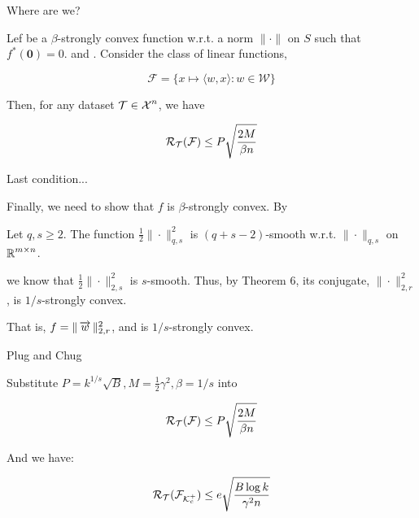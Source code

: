 \begin{frame}{Where are we?}

  \begin{theorem}[9 Generalization]
    Lef  be a $\beta$-strongly convex function w.r.t. a norm $\|\cdot \|$ on $S$ such that
    $f^*(\mathbf{0}) = 0$.  and .
    Consider the class of linear functions,

    \[ \mathcal{F} = \{ x \mapsto \langle w,x \rangle : w \in \mathcal{W} \}\]

    Then, for any dataset $\mathcal{T} \in \operatorname{\mathcal{X}}^n$, we have

    \[ \operatorname{\mathcal{R}}_{\mathcal{T}}(\mathcal{F}) \leq P \sqrt{ \frac{2M}{\beta n}  } \]
  \end{theorem}
      
\end{frame}


\begin{frame}{Last condition...}

  Finally, we need to show that $f$ is $\beta$-strongly convex. By
  
  \begin{corollary}[19]
  Let $q,s \geq 2$. The function $\frac{1}{2}\|\cdot \|^2_{q,s}$ is $(q+s-2)$-smooth w.r.t. $\|\cdot \|_{q,s}$ on $\operatorname{\mathbb{R}}^{m \times n}$.
  \end{corollary}
  
  we know that $\frac{1}{2} \| \cdot \|^2_{2,s}$ is $s$-smooth. Thus, by Theorem 6, its conjugate, $\| \cdot \|_{2,r}^2$, is $1/s$-strongly convex. 

  \vspace*{0.5cm}
  
  That is, $f = \| \operatorname{\overrightarrow{w}}\|^2_{2,r}$, and is $1/s$-strongly convex.

  
\end{frame}


\begin{frame}{Plug and Chug}

  Substitute $P = k^{1/s}\sqrt{B}, M = \frac{1}{2}\gamma^2, \beta = 1/s$ into 

    \[ \operatorname{\mathcal{R}}_{\mathcal{T}}(\mathcal{F}) \leq P \sqrt{ \frac{2M}{\beta n}  } \]

    And we have:

    \[ \operatorname{\mathcal{R}}_{\mathcal{T}}(\mathcal{F}_{\mathcal{K}^+_c}) \leq e \sqrt{\frac{B \log k}{\gamma^2 n}} \]
    
\end{frame}
